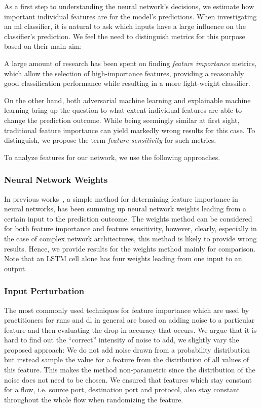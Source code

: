 \documentclass[conference]{IEEEtran}
\begin{document}
As a first step to understanding the neural network's decisions, we  estimate how important individual features are for the model's predictions.
When investigating an \gls{ml} classifier, it is natural to ask which inputs have a large influence on the classifier's prediction. We feel the need to distinguish metrics for this purpose based on their main aim:

A large amount of research has been spent on finding \emph{feature importance} metrics, which allow the selection  of high-importance features, providing a reasonably good classification performance while resulting in a more light-weight classifier.

On the other hand, both adversarial machine learning and explainable machine learning bring up the question to what extent individual features are able to change the prediction outcome. While being seemingly similar at first sight, traditional feature importance can yield markedly wrong results for this case.  To distinguish, we propose the term \emph{feature sensitivity} for such metrics.

To analyze features for our network, we use the following approaches.

\subsubsection{Neural Network Weights}
In previous works~\cite{olden_accurate_2004}, a simple method for determining feature importance in neural networks, has been summing up neural network weights leading from a certain input to the prediction outcome. The weights method can be considered for both feature importance and feature sensitivity, however, clearly, especially in the case of complex network architectures, this method is likely to provide wrong results. Hence, we provide results for the weights method mainly for comparison. Note that an LSTM cell alone has four weights leading from one input to an output. 

\subsubsection{Input Perturbation}

 The most commonly used techniques for feature importance which are used by practitioners for \glspl{rnn} \cite{stackexchange_cross_validated_neural_2019} and \gls{dl} \cite{molnar_interpretable_2019,stackexchange_cross_validated_feature_2016} in general are based on adding noise to a particular feature and then evaluating the drop in accuracy that occurs. We argue that it is hard to find out the ``correct'' intensity of noise to add, we slightly vary the proposed approach: We do not add noise drawn from a probability distribution but instead sample the value for a feature from the distribution of all values of this feature. This makes the method non-parametric since the distribution of the noise does not need to be chosen. We ensured that features which stay constant for a flow, i.e. source port, destination port and protocol, also stay constant throughout the whole flow when randomizing the feature.
\end{document}

